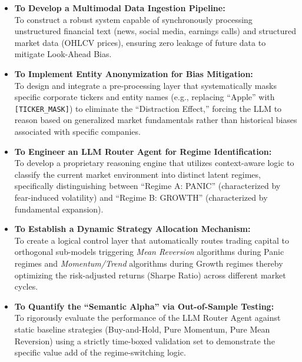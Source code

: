 \documentclass[12pt, a4paper]{report}
\begin{document}
\begin{itemize}
    \item \textbf{To Develop a Multimodal Data Ingestion Pipeline:} \\
    To construct a robust system capable of synchronously processing unstructured financial text (news, social media, earnings calls) and structured market data (OHLCV prices), ensuring zero leakage of future data to mitigate Look-Ahead Bias.

    \item \textbf{To Implement Entity Anonymization for Bias Mitigation:} \\
    To design and integrate a pre-processing layer that systematically masks specific corporate tickers and entity names (e.g., replacing ``Apple'' with \texttt{[TICKER\_MASK]}) to eliminate the ``Distraction Effect,'' forcing the LLM to reason based on generalized market fundamentals rather than historical biases associated with specific companies.

    \item \textbf{To Engineer an LLM Router Agent for Regime Identification:} \\
    To develop a proprietary reasoning engine that utilizes context-aware logic to classify the current market environment into distinct latent regimes, specifically distinguishing between ``Regime A: PANIC'' (characterized by fear-induced volatility) and ``Regime B: GROWTH'' (characterized by fundamental expansion).

    \item \textbf{To Establish a Dynamic Strategy Allocation Mechanism:} \\
    To create a logical control layer that automatically routes trading capital to orthogonal sub-models triggering \textit{Mean Reversion} algorithms during Panic regimes and \textit{Momentum/Trend} algorithms during Growth regimes thereby optimizing the risk-adjusted returns (Sharpe Ratio) across different market cycles.

    \item \textbf{To Quantify the ``Semantic Alpha'' via Out-of-Sample Testing:} \\
    To rigorously evaluate the performance of the LLM Router Agent against static baseline strategies (Buy-and-Hold, Pure Momentum, Pure Mean Reversion) using a strictly time-boxed validation set to demonstrate the specific value add of the regime-switching logic.
\end{itemize}
\end{document}
